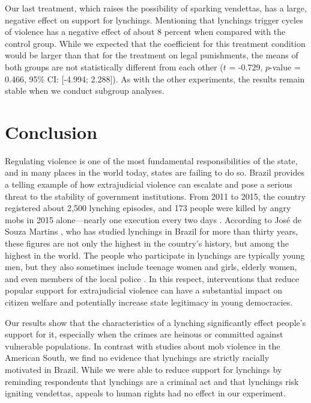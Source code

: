 \documentclass[12pt,a4paper]{article}
\begin{document}
Our last treatment, which raises the possibility of sparking vendettas, has a large, negative effect on support for lynchings. Mentioning that lynchings trigger cycles of violence has a negative effect of about 8 percent when compared with the control group. While we expected that the coefficient for this treatment condition would be larger than that for the treatment on legal punishments, the means of both groups are not statistically different from each other ($t$ = -0.729, $p$-value = 0.466, 95\% CI: [-4.994; 2.288]). As with the other experiments, the results remain stable when we conduct subgroup analyses. 

\section{Conclusion}
\label{conclusion}

Regulating violence is one of the most fundamental responsibilities of the
state, and in many places in the world today, states are failing to do so.
Brazil provides a telling example of how extrajudicial violence can escalate
and pose a serious threat to the stability of government institutions. From
2011 to 2015, the country registered about 2,500 lynching episodes, and 173
people were killed by angry mobs in 2015 alone---nearly one execution every two
days \citep{barbara2015vigilantes, oliveira2016mob}. According to José de Souza
Martins \citeyearpar{martins2015linchamentos}, who has studied lynchings in
Brazil for more than thirty years, these figures are not only the highest in
the country's history, but among the highest in the world. The people who
participate in lynchings are typically young men, but they also sometimes
include teenage women and girls, elderly women, and even members of the local
police \citep{moura2017linchamentos}. In this respect, interventions that
reduce popular support for extrajudicial violence can have a substantial impact
on citizen welfare and potentially increase state legitimacy in young
democracies.

Our results show that the characteristics of a lynching significantly effect
people's support for it, especially when the crimes are heinous or committed
against vulnerable populations. In contrast with studies about mob violence in
the American South, we find no evidence that lynchings are strictly racially
motivated in Brazil. While we were able to reduce support for lynchings by
reminding respondents that lynchings are a criminal act and that lynchings risk
igniting vendettas, appeals to human rights had no effect in our experiment. 
\end{document}
